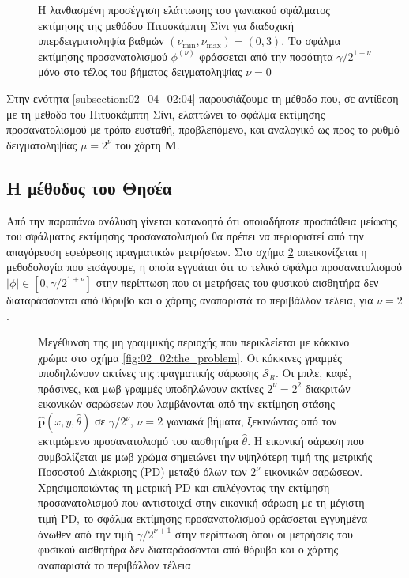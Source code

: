 \begin{figure}[h]\centering
  
  \caption{\small Η λανθασμένη προσέγγιση ελάττωσης του γωνιακού σφάλματος
           εκτίμησης της μεθόδου Πιτυοκάμπτη Σίνι για διαδοχική
           υπερδειγματοληψία βαθμών $(\nu_{\min}, \nu_{\max}) = (0,3)$. Το
           σφάλμα εκτίμησης προσανατολισμού $\phi^{(\nu)}$ φράσσεται από την
           ποσότητα $\gamma/2^{1+\nu}$ μόνο στο τέλος του βήματος
           δειγματοληψίας $\nu=0$}
  \label{fig:02_04_02:sinis}
\end{figure}

Στην ενότητα \ref{subsection:02_04_02:04} παρουσιάζουμε τη μέθοδο που, σε
αντίθεση με τη μέθοδο του Πιτυοκάμπτη Σίνι, ελαττώνει το σφάλμα εκτίμησης
προσανατολισμού με τρόπο ευσταθή, προβλεπόμενο, και αναλογικό ως προς το ρυθμό
δειγματοληψίας $\mu = 2^{\nu}$ του χάρτη $\bm{M}$.

\subsection{Η μέθοδος του Θησέα}
\label{subsection:02_04_02:06}

Από την παραπάνω ανάλυση γίνεται κατανοητό ότι οποιαδήποτε προσπάθεια
μείωσης του σφάλματος εκτίμησης προσανατολισμού θα πρέπει να περιοριστεί από
την απαγόρευση εφεύρεσης πραγματικών μετρήσεων. Στο σχήμα
\ref{fig:oversampling_correct} απεικονίζεται η μεθοδολογία που εισάγουμε, η
οποία εγγυάται ότι το τελικό σφάλμα προσανατολισμού $|\phi| \in [0,\gamma /
2^{1+\nu}]$ στην περίπτωση που οι μετρήσεις του φυσικού αισθητήρα δεν
διαταράσσονται από θόρυβο και ο χάρτης αναπαριστά το περιβάλλον τέλεια, για
$\nu = 2$.

\begin{figure}[h]\centering
  
  \caption{\small Μεγέθυνση της μη γραμμικής περιοχής που περικλείεται με
           κόκκινο χρώμα στο σχήμα \ref{fig:02_02:the_problem}. Οι κόκκινες
           γραμμές υποδηλώνουν ακτίνες της πραγματικής σάρωσης $\mathcal{S}_R$.
           Οι μπλε, καφέ, πράσινες, και μωβ γραμμές υποδηλώνουν
           ακτίνες $2^\nu = 2^2$ διακριτών εικονικών σαρώσεων που λαμβάνονται
           από την εκτίμηση στάσης $\hat{\bm{p}}(x,y,\hat{\theta})$ σε
           $\gamma/2^\nu$, $\nu = 2$ γωνιακά βήματα, ξεκινώντας από τον
           εκτιμώμενο προσανατολισμό του αισθητήρα $\hat{\theta}$. Η εικονική
           σάρωση που συμβολίζεται με μωβ χρώμα σημειώνει την υψηλότερη τιμή
           της μετρικής Ποσοστού Διάκρισης (PD) μεταξύ όλων των $2^\nu$
           εικονικών σαρώσεων. Χρησιμοποιώντας τη μετρική PD και επιλέγοντας
           την εκτίμηση προσανατολισμού που αντιστοιχεί στην εικονική σάρωση με
           τη μέγιστη τιμή PD, το σφάλμα εκτίμησης προσανατολισμού φράσσεται
           εγγυημένα άνωθεν από την τιμή $\gamma/2^{\nu+1}$ στην περίπτωση
           όπου οι μετρήσεις του φυσικού αισθητήρα δεν διαταράσσονται από
           θόρυβο και ο χάρτης αναπαριστά το περιβάλλον τέλεια}
  \label{fig:oversampling_correct}
\end{figure}

